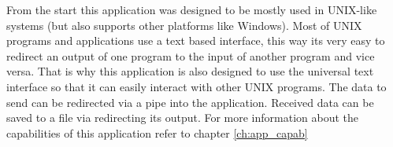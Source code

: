 From the start this application was designed to be mostly used in UNIX-like systems (but also supports other platforms like Windows). Most of UNIX programs and applications use a text based interface, this way its very easy to redirect an output of one program to the input of another program and vice versa. That is why this application is also designed to use the universal text interface so that it can easily interact with other UNIX programs. The data to send can be redirected via a pipe into the application. Received data can be saved to a file via redirecting its output. For more information about the capabilities of this application refer to chapter \ref{ch:app_capab}
